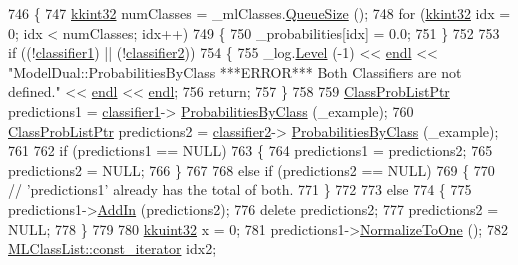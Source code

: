 \begin{DoxyCode}
746 \{
747   \hyperlink{namespace_k_k_b_a8fa4952cc84fda1de4bec1fbdd8d5b1b}{kkint32}  numClasses = \_mlClasses.\hyperlink{class_k_k_b_1_1_k_k_queue_a1dab601f75ee6a65d97f02bddf71c40d}{QueueSize} ();
748   \textcolor{keywordflow}{for}  (\hyperlink{namespace_k_k_b_a8fa4952cc84fda1de4bec1fbdd8d5b1b}{kkint32} idx = 0;  idx < numClasses;  idx++)
749   \{
750     \_probabilities[idx] = 0.0;
751   \}
752 
753   \textcolor{keywordflow}{if}  ((!\hyperlink{class_k_k_m_l_l_1_1_model_dual_a702b5e302cc05ab6cdc3ee4ae8115622}{classifier1})  ||  (!\hyperlink{class_k_k_m_l_l_1_1_model_dual_a18ed538fadc0cb3eebdb9175ccce22e2}{classifier2}))
754   \{
755     \_log.\hyperlink{class_k_k_b_1_1_run_log_a32cf761d7f2e747465fd80533fdbb659}{Level} (-1) << \hyperlink{namespace_k_k_b_ad1f50f65af6adc8fa9e6f62d007818a8}{endl} << \textcolor{stringliteral}{"ModelDual::ProbabilitiesByClass   ***ERROR***      Both
       Classifiers are not defined."} << \hyperlink{namespace_k_k_b_ad1f50f65af6adc8fa9e6f62d007818a8}{endl} << \hyperlink{namespace_k_k_b_ad1f50f65af6adc8fa9e6f62d007818a8}{endl};
756     \textcolor{keywordflow}{return};
757   \}
758 
759   \hyperlink{class_k_k_m_l_l_1_1_class_prob_list}{ClassProbListPtr}  predictions1 = \hyperlink{class_k_k_m_l_l_1_1_model_dual_a702b5e302cc05ab6cdc3ee4ae8115622}{classifier1}->
      \hyperlink{class_k_k_m_l_l_1_1_classifier2_aa07fe8d55a8b09ea2d2051f5a7cdb72c}{ProbabilitiesByClass} (\_example);
760   \hyperlink{class_k_k_m_l_l_1_1_class_prob_list}{ClassProbListPtr}  predictions2 = \hyperlink{class_k_k_m_l_l_1_1_model_dual_a18ed538fadc0cb3eebdb9175ccce22e2}{classifier2}->
      \hyperlink{class_k_k_m_l_l_1_1_classifier2_aa07fe8d55a8b09ea2d2051f5a7cdb72c}{ProbabilitiesByClass} (\_example);
761 
762   \textcolor{keywordflow}{if}  (predictions1 == NULL)
763   \{
764     predictions1 = predictions2;
765     predictions2 = NULL;
766   \}
767 
768   \textcolor{keywordflow}{else} \textcolor{keywordflow}{if}  (predictions2 == NULL)
769   \{
770     \textcolor{comment}{// 'predictions1' already has the total of both.}
771   \}
772 
773   \textcolor{keywordflow}{else}
774   \{
775     predictions1->\hyperlink{class_k_k_m_l_l_1_1_class_prob_list_a98fdb0e8bfe0b2f4509065a44fe23da7}{AddIn} (predictions2);
776     \textcolor{keyword}{delete}  predictions2;
777     predictions2 = NULL;
778   \}
779 
780   \hyperlink{namespace_k_k_b_af8d832f05c54994a1cce25bd5743e19a}{kkuint32} x = 0;
781   predictions1->\hyperlink{class_k_k_m_l_l_1_1_class_prob_list_a998993b0a25ba7fd35cfa540277d0638}{NormalizeToOne} ();
782   \hyperlink{class_k_k_b_1_1_k_k_queue_aeb057c9c010446f46f57c1e355f981f1}{MLClassList::const\_iterator}  idx2;

\end{DoxyCode}

